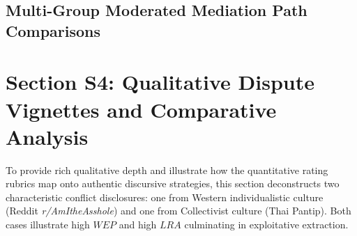 \documentclass[11pt,a4paper]{article}
\begin{document}
\subsection{Multi-Group Moderated Mediation Path Comparisons}

\begin{table}[htbp]
\centering
\small
\caption{Multi-Group Structural Path Comparisons (Study 1 English vs. Study 2 Thai)}
\label{tab:supp_mga_paths}
\end{table}

\newpage
\section{Section S4: Qualitative Dispute Vignettes and Comparative Analysis}
\label{sec:supp_vignettes}

To provide rich qualitative depth and illustrate how the quantitative rating rubrics map onto authentic discursive strategies, this section deconstructs two characteristic conflict disclosures: one from Western individualistic culture (Reddit \textit{r/AmItheAsshole}) and one from Collectivist culture (Thai Pantip). Both cases illustrate high $WEP$ and high $LRA$ culminating in exploitative extraction.
\end{document}
